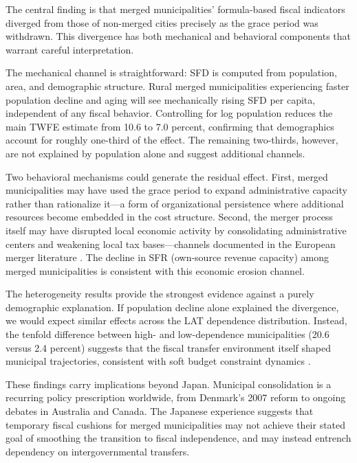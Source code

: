 \documentclass[12pt]{article}
\begin{document}
The central finding is that merged municipalities' formula-based fiscal indicators diverged from those of non-merged cities precisely as the grace period was withdrawn. This divergence has both mechanical and behavioral components that warrant careful interpretation.

The mechanical channel is straightforward: SFD is computed from population, area, and demographic structure. Rural merged municipalities experiencing faster population decline and aging will see mechanically rising SFD per capita, independent of any fiscal behavior. Controlling for log population reduces the main TWFE estimate from 10.6 to 7.0 percent, confirming that demographics account for roughly one-third of the effect. The remaining two-thirds, however, are not explained by population alone and suggest additional channels.

Two behavioral mechanisms could generate the residual effect. First, merged municipalities may have used the grace period to expand administrative capacity rather than rationalize it---a form of organizational persistence where additional resources become embedded in the cost structure. Second, the merger process itself may have disrupted local economic activity by consolidating administrative centers and weakening local tax bases---channels documented in the European merger literature \citep{blesse2016}. The decline in SFR (own-source revenue capacity) among merged municipalities is consistent with this economic erosion channel.

The heterogeneity results provide the strongest evidence against a purely demographic explanation. If population decline alone explained the divergence, we would expect similar effects across the LAT dependence distribution. Instead, the tenfold difference between high- and low-dependence municipalities (20.6 versus 2.4 percent) suggests that the fiscal transfer environment itself shaped municipal trajectories, consistent with soft budget constraint dynamics \citep{kornai1986}.

These findings carry implications beyond Japan. Municipal consolidation is a recurring policy prescription worldwide, from Denmark's 2007 reform to ongoing debates in Australia and Canada. The Japanese experience suggests that temporary fiscal cushions for merged municipalities may not achieve their stated goal of smoothing the transition to fiscal independence, and may instead entrench dependency on intergovernmental transfers.
\end{document}
